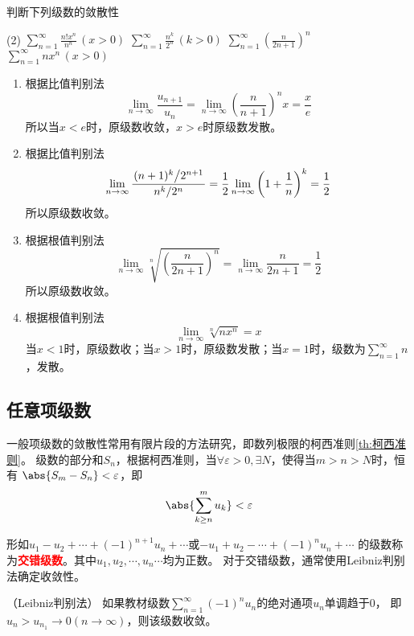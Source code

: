 \begin{example}
    判断下列级数的敛散性
    \begin{tasks}[label=(\arabic*),label-width = 2em](2)
        \task $\displaystyle \sum_{n=1}^\infty \frac{n!x^n}{n^n}\,(x>0)$
        \task $\displaystyle \sum_{n=1}^\infty \frac{n^k}{2^n}\,(k>0)$
        \task $\displaystyle \sum_{n=1}^\infty \left(\frac{n}{2n+1}\right)^n$
        \task $\displaystyle \sum_{n=1}^\infty nx^n\,(x>0)$
    \end{tasks}
\end{example}
\begin{solution}
    \begin{enumerate}[(1)]
        \item 根据比值判别法
              \[ \lim_{n\to\infty} \frac{u_{n+1}}{u_n} = \lim_{n\to\infty} \left(\frac{n}{n+1}\right)^{n}x = \frac{x}{e}\]
              所以当$x<e$时，原级数收敛，$x>e$时原级数发散。
        \item 根据比值判别法
              \[
                  \lim_{n\to\infty} \frac{\left.(n+1)^k\middle/2^{n+1}\right.}{\left.n^k\middle/2^{n}\right.}
                  =
                  \frac{1}{2}\lim_{n\to\infty} \left(1+\frac{1}{n}\right)^k
                  =
                  \frac{1}{2}
              \]
              所以原级数收敛。
        \item 根据根值判别法
              \[
                  \lim_{n\to\infty} \sqrt[n]{\left(\frac{n}{2n+1}\right)^n}
                  =
                  \lim_{n\to\infty} \frac{n}{2n+1}
                  =
                  \frac{1}{2}
              \]
              所以原级数收敛。
        \item 根据根值判别法
              \[ \lim_{n\to\infty} \sqrt[n]{nx^n} = x \]
              当$x<1$时，原级数收；当$x>1$时，原级数发散；当$x=1$时，级数为$\displaystyle\sum_{n=1}^\infty n$，发散。
    \end{enumerate}
\end{solution}

\subsection{任意项级数}
一般项级数的敛散性常用有限片段的方法研究，即数列极限的柯西准则\ref{th:柯西准则}。
级数的部分和$S_n$，根据柯西准则，当$\forall \varepsilon > 0,\exists N$，使得当$m>n>N$时，恒有
$\abs{S_m-S_n}<\varepsilon$，即
\[ \abs{\sum_{k\geq n}^m u_k}<\varepsilon \]


形如$u_1 - u_2 + \cdots + (-1)^{n+1}u_n + \cdots$或$-u_1 + u_2 - \cdots + (-1)^n u_n + \cdots$
的级数称为\textcolor{red}{\textbf{\textsf{交错级数}}}。其中$u_1,u_2,\cdots,u_n\cdots$均为正数。
对于交错级数，通常使用Leibniz判别法确定收敛性。
\begin{theorem}
    （Leibniz判别法）
    \label{th:Leibniz判别法}
    如果教材级数$\displaystyle\sum_{n=1}^\infty(-1)^n u_n$的绝对通项$u_n$单调趋于$0$，
    即$u_n>u_{n_1}\to 0(n\to\infty)$，则该级数收敛。
\end{theorem}

